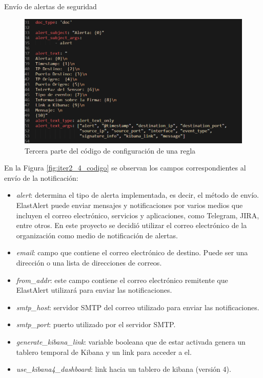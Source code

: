 \begin{section}{Envío de alertas de seguridad}
\begin{itemize}
    \end{itemize}
    \begin{figure}[H]
    \centering
        \includegraphics[width=1\textwidth]{./iteracion_2_imagenes/5-codigoAlerta3.png}
        \caption{Tercera parte del código de configuración de una regla}
        \label{fig:iter2_3_codigo}
    \end{figure}
    \FloatBarrier
    En la Figura \ref{fig:iter2_4_codigo} se observan los campos correspondientes al envío de la notificación:
    \begin{itemize}
        \item \textit{alert}: determina el tipo de alerta implementada, es decir, el método de envío. ElastAlert puede enviar mensajes y notificaciones por varios medios que incluyen el correo electrónico, servicios y aplicaciones, como Telegram, JIRA, entre otros. En este proyecto se decidió utilizar el correo electrónico de la organización como medio de notificación de alertas.
        \item \textit{email}: campo que contiene el correo electrónico de destino. Puede ser una dirección o una lista de direcciones de correos.
        \item \textit{from\_addr}: este campo contiene el correo electrónico remitente que ElastAlert utilizará para enviar las notificaciones.
        \item \textit{smtp\_host}: servidor SMTP del correo utilizado para enviar las notificaciones.
        \item \textit{smtp\_port}: puerto utilizado por el servidor SMTP.
        \item \textit{generate\_kibana\_link}: variable booleana que de estar activada genera un tablero temporal de Kibana y un link para acceder a el.
        \item \textit{use\_kibana4\_dashboard}: link hacia un tablero de kibana (versión 4).

\end{itemize}
\end{section}
